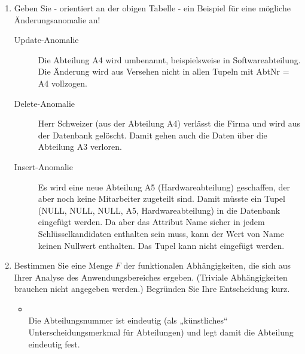 \documentclass{lehramt-informatik-aufgabe}
\begin{document}
\begin{enumerate}


\item Geben Sie - orientiert an der obigen Tabelle - ein Beispiel für
eine mögliche Änderungsanomalie an!

\begin{liAntwort}
\begin{description}
\item[Update-Anomalie]

Die Abteilung A4 wird umbenannt, beispielsweise in Softwareabteilung.
Die Änderung wird aus Versehen nicht in allen Tupeln mit AbtNr = A4
vollzogen.

\item[Delete-Anomalie]

Herr Schweizer (aus der Abteilung A4) verlässt die Firma und wird aus
der Datenbank gelöscht. Damit gehen auch die Daten über die Abteilung A3
verloren.

\item[Insert-Anomalie]

Es wird eine neue Abteilung A5 (Hardwareabteilung) geschaffen, der aber
noch keine Mitarbeiter zugeteilt sind. Damit müsste ein Tupel (NULL,
NULL, NULL, A5, Hardwareabteilung) in die Datenbank eingefügt werden. Da
aber das Attribut Name sicher in jedem Schlüsselkandidaten enthalten
sein muss, kann der Wert von Name keinen Nullwert enthalten. Das Tupel
kann nicht eingefügt werden.

\end{description}
\end{liAntwort}


\item Bestimmen Sie eine Menge $F$ der funktionalen Abhängigkeiten, die
sich aus Ihrer Analyse des Anwendungsbereiches ergeben. (Triviale
Abhängigkeiten brauchen nicht angegeben werden.) Begründen Sie Ihre
Entscheidung kurz.

\begin{liAntwort}
\begin{itemize}
\item {} \\
Die Abteilungsnummer ist eindeutig (als „künstliches“
Unterscheidungsmerkmal für Abteilungen) und legt damit die Abteilung
eindeutig fest.


\end{itemize}
\end{liAntwort}
\end{enumerate}
\end{document}

